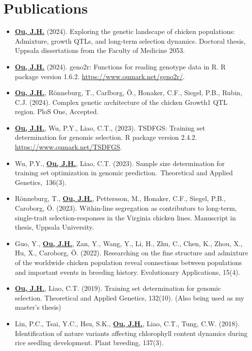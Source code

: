 \documentclass[10pt]{article}
\begin{document}
\section*{Publications}
\begin{itemize}
\item \underline{\bf Ou, J.H.} (2024). Exploring the genetic landscape of chicken populations: Admixture, growth QTLs, and long-term selection dynamics. Doctoral thesis, Uppsala dissertations from the Faculty of Medicine 2053.
\item \underline{\bf Ou, J.H.} (2024). geno2r: Functions for reading genotype data in R. R package version 1.6.2. \url{https://www.oumark.net/geno2r/}.
\item \underline{\bf Ou, J.H.}, Rönneburg, T., Carlborg, Ö., Honaker, C.F., Siegel, P.B., Rubin, C.J. (2024). Complex genetic architecture of the chicken Growth1 QTL region. PloS One, Accepted.
\item \underline{\bf Ou, J.H.}, Wu, P.Y., Liao, C.T., (2023). TSDFGS: Training set determination for genomic selection. R package version 2.4.2. \url{https://www.oumark.net/TSDFGS}.
\item Wu, P.Y., \underline{\bf Ou, J.H.}, Liao, C.T. (2023). Sample size determination for training set optimization in genomic prediction. Theoretical and Applied Genetics, 136(3).
\item Rönneburg, T., \underline{\bf Ou, J.H.}, Pettersson, M., Honaker, C.F., Siegel, P.B., Caroborg, Ö. (2023). Within-line segregation as contributors to long-term, single-trait selection-responses in the Virginia chicken lines. Manuscript in thesis, Uppsala University.
\item Guo, Y., \underline{\bf Ou, J.H.}, Zan, Y., Wang, Y., Li, H., Zhu, C., Chen, K., Zhou, X., Hu, X., Caroborg, Ö. (2022). Researching on the fine structure and admixture of the worldwide chicken population reveal connections between populations and important events in breeding history. Evolutionary Applications, 15(4).
\item \underline{\bf Ou, J.H.}, Liao, C.T. (2019). Training set determination for genomic selection. Theoretical and Applied Genetics, 132(10). (Also being used as my master's thesis)
\item Lin, P.C., Tsai, Y.C., Hsu, S.K., \underline{\bf Ou, J.H.}, Liao, C.T., Tung, C.W. (2018). Identification of nature variants affecting chlorophyll content dynamics during rice seedling development. Plant breeding, 137(3).

\end{itemize}
\end{document}
